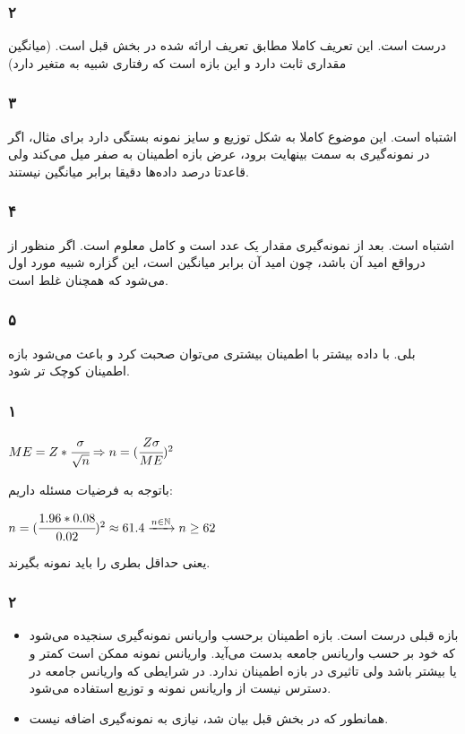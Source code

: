 \documentclass[12pt]{article}
\begin{document}
\begin{itemize}
	\subsubsection{۲}
	درست است. این تعریف کاملا مطابق تعریف ارائه شده در بخش قبل است. (میانگین مقداری ثابت دارد و این بازه است که رفتاری شبیه به متغیر دارد)
	\subsubsection{۳}
	اشتباه است. این موضوع کاملا به شکل توزیع و سایز نمونه بستگی دارد برای مثال، اگر 
	در نمونه‌گیری به سمت بینهایت برود، عرض بازه اطمینان به صفر میل می‌کند ولی قاعدتا 
	درصد داده‌ها دقیقا برابر میانگین نیستند.
	\subsubsection{۴}
	اشتباه است. بعد از نمونه‌گیری مقدار
		یک عدد است و کامل معلوم است. اگر منظور از 
		درواقع امید آن باشد، چون امید آن برابر میانگین است، این گزاره شبیه مورد اول می‌شود که همچنان غلط است.
	\subsubsection{۵}
		بلی. با داده بیشتر با اطمینان بیشتری می‌توان صحبت کرد و باعث می‌شود بازه اطمینان کوچک تر شود.
\subsubsection{۱}
\begin{latin}
	$
	ME = Z * \cfrac{\sigma}{\sqrt{n}} \Rightarrow n = (\cfrac{Z \sigma}{ME})^2 
	$
\end{latin}
باتوجه به فرضیات مسئله داریم:
\begin{latin}
	$
	n = (\cfrac{1.96 * 0.08}{0.02})^2 \approx 61.4 \xrightarrow{n \in \mathbb{N}} n \geq 62
	$
\end{latin}
یعنی حداقل 
بطری را باید نمونه بگیرند.
\subsubsection{۲}
\begin{itemize}
	\item 
	بازه قبلی درست است. بازه اطمینان برحسب واریانس نمونه‌گیری سنجیده می‌شود که خود بر حسب واریانس جامعه بدست می‌آید. واریانس نمونه ممکن است کمتر و یا بیشتر باشد ولی تاثیری در بازه اطمینان ندارد. در شرایطی که واریانس جامعه در دسترس نیست از واریانس نمونه و توزیع 
	استفاده می‌شود.
	\item 
	همانطور که در بخش قبل بیان شد، نیازی به نمونه‌گیری اضافه نیست. 
\end{itemize}

\end{itemize}
\end{document}
